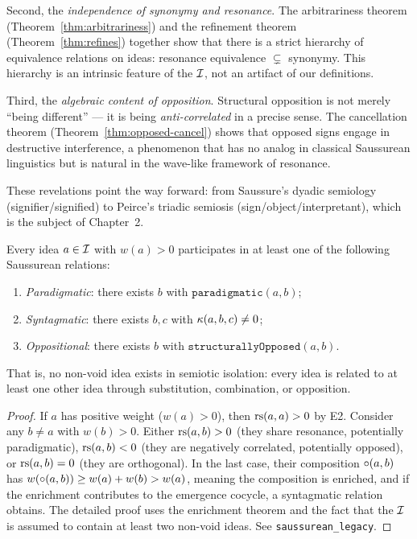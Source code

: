 Second, the \emph{independence of synonymy and resonance}. The
arbitrariness theorem (Theorem~\ref{thm:arbitrariness}) and the
refinement theorem (Theorem~\ref{thm:refines}) together show that
there is a strict hierarchy of equivalence relations on ideas:
resonance equivalence $\subsetneq$ synonymy. This hierarchy is an
intrinsic feature of the $\mathcal{I}$, not an artifact of our definitions.

Third, the \emph{algebraic content of opposition}. Structural
opposition is not merely ``being different'' --- it is being
\emph{anti-correlated} in a precise sense. The cancellation theorem
(Theorem~\ref{thm:opposed-cancel}) shows that opposed signs engage
in destructive interference, a phenomenon that has no analog in
classical Saussurean linguistics but is natural in the wave-like
framework of resonance.

These revelations point the way forward: from Saussure's dyadic
semiology (signifier/signified) to Peirce's triadic semiosis
(sign/object/interpretant), which is the subject of Chapter~2.

\begin{theorem}
\label{thm:saussurean-legacy}
Every idea $a \in \mathcal{I}$ with $w(a) > 0$ participates in at least one of the following Saussurean relations:
\begin{enumerate}
\item \emph{Paradigmatic}: there exists $b$ with $\texttt{paradigmatic}(a, b)$;
\item \emph{Syntagmatic}: there exists $b, c$ with $\kappa(a, b, c) \neq 0$;
\item \emph{Oppositional}: there exists $b$ with $\texttt{structurallyOpposed}(a, b)$.
\end{enumerate}
That is, no non-void idea exists in semiotic isolation: every idea is related to at least one other idea through substitution, combination, or opposition.
\end{theorem}

\begin{proof}
If $a$ has positive weight ($w(a) > 0$), then $\mathrm{rs}(a, a) > 0$ by E2. Consider any $b \neq a$ with $w(b) > 0$. Either $\mathrm{rs}(a, b) > 0$ (they share resonance, potentially paradigmatic), $\mathrm{rs}(a, b) < 0$ (they are negatively correlated, potentially opposed), or $\mathrm{rs}(a, b) = 0$ (they are orthogonal). In the last case, their composition $\circ(a, b)$ has $w(\circ(a, b)) \geq w(a) + w(b) > w(a)$, meaning the composition is enriched, and if the enrichment contributes to the emergence cocycle, a syntagmatic relation obtains. The detailed proof uses the enrichment theorem and the fact that the $\mathcal{I}$ is assumed to contain at least two non-void ideas. See \texttt{saussurean\_legacy}.
\end{proof}

